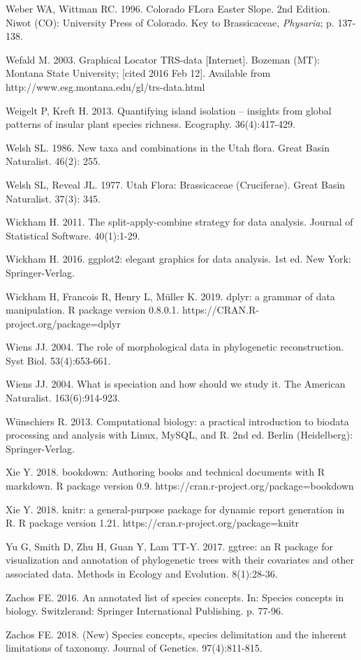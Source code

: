 Weber WA, Wittman RC. 1996. Colorado FLora Easter Slope. 2nd Edition. Niwot (CO): University Press of Colorado. Key to Brassicaceae, \textit{Physaria}; p. 137-138.

Wefald M. 2003. Graphical Locator TRS-data [Internet]. Bozeman (MT): Montana State University; [cited 2016 Feb 12]. Available from http://www.esg.montana.edu/gl/trs-data.html

Weigelt P, Kreft H. 2013. Quantifying island isolation – insights from global patterns of insular plant species richness. Ecography. 36(4):417-429.

Welsh SL. 1986. New taxa and combinations in the Utah flora. Great Basin Naturalist. 46(2): 255.

Welsh SL, Reveal JL. 1977. Utah Flora: Brassicaceae (Cruciferae). Great Basin Naturalist. 37(3): 345.

Wickham H. 2011. The split-apply-combine strategy for data analysis. Journal of Statistical Software. 40(1):1-29.

Wickham H. 2016. ggplot2: elegant graphics for data analysis. 1st ed. New York: Springer-Verlag.
  
Wickham H, Francois R, Henry L, Müller K. 2019. dplyr: a grammar of data manipulation. R package version 0.8.0.1. https://CRAN.R-project.org/package=dplyr

Wiens JJ. 2004. The role of morphological data in phylogenetic reconstruction. Syst Biol. 53(4):653-661.

Wiens JJ. 2004. What is speciation and how should we study it. The American Naturalist. 163(6):914-923.

Wünschiers R. 2013. Computational biology: a practical introduction to biodata processing and analysis with Linux, MySQL, and R. 2nd ed. Berlin (Heidelberg): Springer-Verlag.

Xie Y. 2018. bookdown: Authoring books and technical documents with R markdown. R package version 0.9. https://cran.r-project.org/package=bookdown
  
Xie Y. 2018. knitr: a general-purpose package for dynamic report generation in R. R package version 1.21. https://cran.r-project.org/package=knitr

Yu G, Smith D, Zhu H, Guan Y, Lam TT-Y. 2017. ggtree: an R package for visualization and annotation of phylogenetic trees with their covariates and other associated data. Methods in Ecology and Evolution. 8(1):28-36.

Zachos FE. 2016. An annotated list of species concepts. In: Species concepts in biology. Switzlerand: Springer International Publishing. p. 77-96.

Zachos FE. 2018. (New) Species concepts, species delimitation and the inherent limitations of taxonomy. Journal of Genetics. 97(4):811-815.

\setlength{\parindent}{0em}
\setlength{\leftskip}{0em}
\setlength{\parskip}{6pt}
\doublespacing
